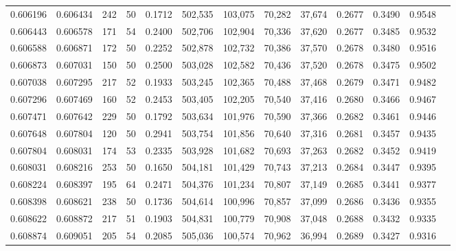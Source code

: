 \begin{tabular}{rrrrrrrrrrrrr}
0.606196 & 0.606434 &   242 &  50 &                                     0.1712 & 502,535 & 103,075 &  70,282 &  37,674 & 0.2677 & 0.3490 & 0.9548 \\
0.606443 & 0.606578 &   171 &  54 &                                     0.2400 & 502,706 & 102,904 &  70,336 &  37,620 & 0.2677 & 0.3485 & 0.9532 \\
0.606588 & 0.606871 &   172 &  50 &                                     0.2252 & 502,878 & 102,732 &  70,386 &  37,570 & 0.2678 & 0.3480 & 0.9516 \\
0.606873 & 0.607031 &   150 &  50 &                                     0.2500 & 503,028 & 102,582 &  70,436 &  37,520 & 0.2678 & 0.3475 & 0.9502 \\
0.607038 & 0.607295 &   217 &  52 &                                     0.1933 & 503,245 & 102,365 &  70,488 &  37,468 & 0.2679 & 0.3471 & 0.9482 \\
0.607296 & 0.607469 &   160 &  52 &                                     0.2453 & 503,405 & 102,205 &  70,540 &  37,416 & 0.2680 & 0.3466 & 0.9467 \\
0.607471 & 0.607642 &   229 &  50 &                                     0.1792 & 503,634 & 101,976 &  70,590 &  37,366 & 0.2682 & 0.3461 & 0.9446 \\
0.607648 & 0.607804 &   120 &  50 &                                     0.2941 & 503,754 & 101,856 &  70,640 &  37,316 & 0.2681 & 0.3457 & 0.9435 \\
0.607804 & 0.608031 &   174 &  53 &                                     0.2335 & 503,928 & 101,682 &  70,693 &  37,263 & 0.2682 & 0.3452 & 0.9419 \\
0.608031 & 0.608216 &   253 &  50 &                                     0.1650 & 504,181 & 101,429 &  70,743 &  37,213 & 0.2684 & 0.3447 & 0.9395 \\
0.608224 & 0.608397 &   195 &  64 &                                     0.2471 & 504,376 & 101,234 &  70,807 &  37,149 & 0.2685 & 0.3441 & 0.9377 \\
0.608398 & 0.608621 &   238 &  50 &                                     0.1736 & 504,614 & 100,996 &  70,857 &  37,099 & 0.2686 & 0.3436 & 0.9355 \\
0.608622 & 0.608872 &   217 &  51 &                                     0.1903 & 504,831 & 100,779 &  70,908 &  37,048 & 0.2688 & 0.3432 & 0.9335 \\
0.608874 & 0.609051 &   205 &  54 &                                     0.2085 & 505,036 & 100,574 &  70,962 &  36,994 & 0.2689 & 0.3427 & 0.9316 \\

\end{tabular}
